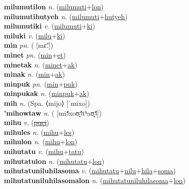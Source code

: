 \textbf{milumutilon} \textit{n.} (\hyperref[milumuti]{milumuti}+\hyperref[lon]{lon})
 \label{milumutilon} \\
\textbf{milumutihutyeh} \textit{n.} (\hyperref[milumuti]{milumuti}+\hyperref[hutyeh]{hutyeh})
 \label{milumutihutyeh} \\
\textbf{milumutiki} \textit{v.} (\hyperref[milumuti]{milumuti}+\hyperref[ki]{ki})
 \label{milumutiki} \\
\textbf{miluki} \textit{v.} (\hyperref[milu]{milu}+\hyperref[ki]{ki})
 \label{miluki} \\
\textbf{min} \textit{pn.} ( [mɛ̃ː])
 \label{min} \\
\textbf{minet} \textit{pn.} (\hyperref[min]{min}+\hyperref[et]{et})
 \label{minet} \\
\textbf{minetak} \textit{n.} (\hyperref[minet]{minet}+\hyperref[ak]{ak})
 \label{minetak} \\
\textbf{minak} \textit{n.} (\hyperref[min]{min}+\hyperref[ak]{ak})
 \label{minak} \\
\textbf{minpuk} \textit{pn.} (\hyperref[min]{min}+\hyperref[puk]{puk})
 \label{minpuk} \\
\textbf{minpukak} \textit{n.} (\hyperref[minpuk]{minpuk}+\hyperref[ak]{ak})
 \label{minpukak} \\
\textbf{mih} \textit{n.} (Spa. ⟨mijo⟩ [ˈmixo])
 \label{mih} \\
\textbf{'mihowtaw} \textit{n.} ( [mi˧˥xoʊ̯˧˥tʰaʊ̯˧˥])
 \label{'mihowtaw} \\
\textbf{mihu} \textit{v.} (\hyperref[puci]{\sout{puci}})
 \label{mihu} \\
\textbf{mihules} \textit{n.} (\hyperref[mihu]{mihu}+\hyperref[les]{les})
 \label{mihules} \\
\textbf{mihulon} \textit{n.} (\hyperref[mihu]{mihu}+\hyperref[lon]{lon})
 \label{mihulon} \\
\textbf{mihutatu} \textit{v.} (\hyperref[mihu]{mihu}+\hyperref[tatu]{tatu})
 \label{mihutatu} \\
\textbf{mihutatulon} \textit{n.} (\hyperref[mihutatu]{mihutatu}+\hyperref[lon]{lon})
 \label{mihutatulon} \\
\textbf{mihutatuniluhilasoma} \textit{v.} (\hyperref[mihutatu]{mihutatu}+\hyperref[nilu]{nilu}+\hyperref[hila]{hila}+\hyperref[soma]{soma})
 \label{mihutatuniluhilasoma} \\
\textbf{mihutatuniluhilasomalon} \textit{n.} (\hyperref[mihutatuniluhilasoma]{mihutatuniluhilasoma}+\hyperref[lon]{lon})
 \label{mihutatuniluhilasomalon} \\

